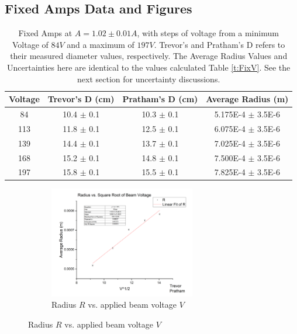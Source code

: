 \documentclass[12pt]{article}
\begin{document}
\clearpage

\subsection{Fixed Amps Data and Figures}

\begin{table}[h]
    \centering
    \begin{tabular}{|c|c|c|c|}
        \hline
        Voltage & Trevor's D (cm) & Pratham's D (cm) & Average Radius (m) \\ 
        \hline
        84 & 10.4 $\pm$ 0.1 & 10.3 $\pm$ 0.1 & 5.175E-4 $\pm$ 3.5E-6 \\ 
        113 & 11.8 $\pm$ 0.1 & 12.5 $\pm$ 0.1 & 6.075E-4 $\pm$ 3.5E-6 \\ 
        139 & 14.4 $\pm$ 0.1 & 13.7 $\pm$ 0.1 & 7.025E-4 $\pm$ 3.5E-6 \\ 
        168 & 15.2 $\pm$ 0.1 & 14.8 $\pm$ 0.1 & 7.500E-4 $\pm$ 3.5E-6 \\
        197 & 15.8 $\pm$ 0.1 & 15.5 $\pm$ 0.1 & 7.825E-4 $\pm$ 3.5E-6 \\
        \hline
    \end{tabular}
    \caption{Fixed Amps at $A = 1.02\pm0.01 A$, with steps of voltage from a minimum Voltage of $84V$ and a maximum of $197V$. Trevor's and Pratham's D refers to their measured diameter values, respectively. The Average Radius Values and Uncertainties here are identical to the values calculated Table \ref{t:FixV}. See the next section for uncertainty discussions.}
    \label{t:FixA}
\end{table}

\begin{figure} [h]
    \begin{subfigure}
        \centering
        \includegraphics[width=0.7\textwidth]{figures/EOM_Fix_Amps.png}
        \caption{Radius $R$ vs. applied beam voltage $V$}
        \label{f:FixA}
    \end{subfigure}
\end{figure}
\end{document}
